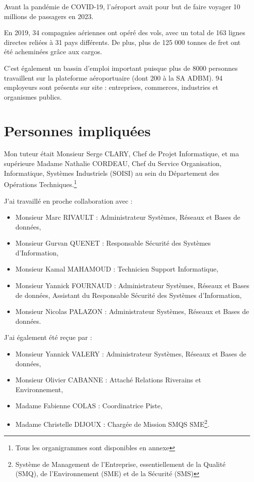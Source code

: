 Avant la pandémie de COVID-19, l'aéroport avait pour but de faire voyager 10 millions de passagers en 2023.

En 2019, 34 compagnies aériennes ont opéré des vols, avec un total de 163 lignes directes reliées à 31 pays différents.
De plus, plus de 125 000 tonnes de fret ont été acheminées grâce aux cargos.

C'est également un bassin d'emploi important puisque plus de 8000 personnes travaillent sur la plateforme aéroportuaire (dont 200 à la SA ADBM).
94 employeurs sont présents sur site : entreprises, commerces, industries et organismes publics.

\section{Personnes impliquées}


Mon tuteur était Monsieur Serge CLARY, Chef de Projet Informatique, et ma supérieure Madame Nathalie CORDEAU, Chef du Service Organisation, Informatique, Systèmes Industriels (SOISI) au sein du Département des Opérations Techniques.\footnote{Tous les organigrammes sont disponibles en annexe}

J'ai travaillé en proche collaboration avec :

\begin{itemize}
    \item Monsieur Marc RIVAULT : Administrateur Systèmes, Réseaux et Bases de données,
    \item Monsieur Gurvan QUENET : Responsable Sécurité des Systèmes d'Information,
    \item Monsieur Kamal MAHAMOUD : Technicien Support Informatique,
    \item Monsieur Yannick FOURNAUD : Administrateur Systèmes, Réseaux et Bases de données, Assistant du Responsable Sécurité des Systèmes d'Information,\newline
    \item Monsieur Nicolas PALAZON : Administrateur Systèmes, Réseaux et Bases de données.
\end{itemize}

J'ai également été reçue par :

\begin{itemize}
    \item Monsieur Yannick VALERY : Administrateur Systèmes, Réseaux et Bases de données,
    \item Monsieur Olivier CABANNE : Attaché Relations Riverains et Environnement,
    \item Madame Fabienne COLAS : Coordinatrice Piste,
    \item Madame Christelle DIJOUX : Chargée de Mission SMQS SME\footnote{Système de Management de l'Entreprise, essentiellement de la Qualité (SMQ), de l'Environnement (SME) et de la Sécurité (SMS)}.\newline
\end{itemize}


